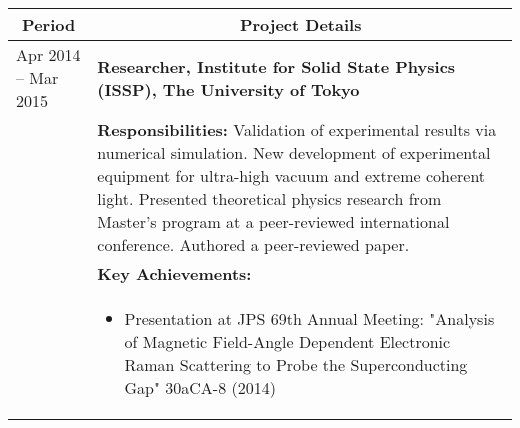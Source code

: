 \documentclass[uplatex,a4j,10.5pt,dvipdfmx]{jsarticle}
\begin{document}
\begin{longtable}{|l|p{14cm}|}
	\hline
	\multicolumn{1}{|c|}{\textbf{Period}} & \multicolumn{1}{c|}{\textbf{Project Details}}                                                                                                                                                                                                                                                                                                                                                                                                                                                           \\
	\hline
	\endhead
	Apr 2014 -- Mar 2015                  & \textbf{\textbullet{} Researcher, Institute for Solid State Physics (ISSP), The University of Tokyo}                                                                                                                                                                                                                                                                                                                                                                                                    \\
	                                      & {\small \textbf{Responsibilities:}} Validation of experimental results via numerical simulation. New development of experimental equipment for ultra-high vacuum and extreme coherent light. Presented theoretical physics research from Master's program at a peer-reviewed international conference. Authored a peer-reviewed paper.                                                                                                                                                                  \\[10mm]
	                                      & {\small \textbf{Key Achievements:}}                                                                                                                                                                                                                                                                                                                                                                                                                                                                     \\[-5mm]
	                                      & \begin{itemize}[leftmargin=*]
		                                        \item Presentation at JPS 69th Annual Meeting: "Analysis of Magnetic Field-Angle Dependent Electronic Raman Scattering to Probe the Superconducting Gap" 30aCA-8 (2014)

\end{itemize}
\end{longtable}
\end{document}
